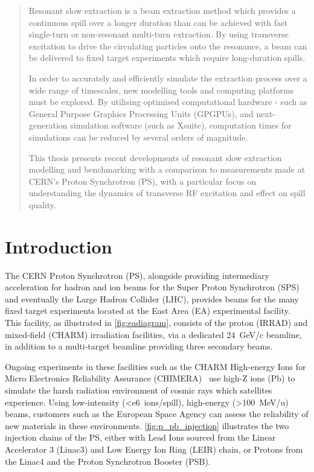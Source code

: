 \documentclass[11pt]{report}
\begin{document}


\newpage
\tableofcontents
\thispagestyle{empty}

\newpage
\thispagestyle{empty}
\begin{abstract}
	\par{Resonant slow extraction is a beam extraction method which provides a continuous spill over a longer duration than can be achieved with fast single-turn or non-resonant multi-turn extraction. By using transverse excitation to drive the circulating particles onto the resonance, a beam can be delivered to fixed target experiments which require long-duration spills.}
\newline
	\par{In order to accurately and efficiently simulate the extraction process over a wide range of timescales, new modelling tools and computing platforms must be explored. By utilising optimised computational hardware - such as General Purpose Graphics Processing Units (GPGPUs), and next-generation simulation software (such as Xsuite), computation times for simulations can be reduced by several orders of magnitude.}
\newline
	\par{This thesis presents recent developments of resonant slow extraction modelling and benchmarking with a comparison to measurements made at CERN’s Proton Synchrotron (PS), with a particular focus on understanding the dynamics of transverse RF excitation and effect on spill quality.}


\end{abstract}

\newpage
\chapter{Introduction}


The CERN Proton Synchrotron (PS), alongside providing intermediary acceleration for hadron and ion beams for the Super Proton Synchrotron (SPS) and eventually the Large Hadron Collider (LHC), provides beams for the many fixed target experiments located at the East Area (EA) experimental facility. This facility, as illustrated in \autoref{fig:eadiagram}, consists of the proton (IRRAD) and mixed-field (CHARM) irradiation facilities, via a dedicated \qty{24}{GeV/c} beamline, in addition to a multi-target beamline providing three secondary beams.

Ongoing experiments in these facilities such as the CHARM High-energy Ions for Micro Electronics Reliability Assurance (CHIMERA)~\cite{Fraser:feasibility} use high-Z ions (Pb) to simulate the harsh radiation environment of cosmic rays which satellites experience. Using low-intensity (\qty{<e6}{ions/spill}), high-energy (\qty{>100}{\MeV / u}) beams, customers such as the European Space Agency can assess the reliability of new materials in these environments. \autoref{fig:p_pb_injection} illustrates the two injection chains of the PS, either with Lead Ions sourced from the Linear Accelerator 3 (Linac3) and Low Energy Ion Ring (LEIR) chain, or Protons from the Linac4 and the Proton Synchrotron Booster (PSB).
\end{document}
